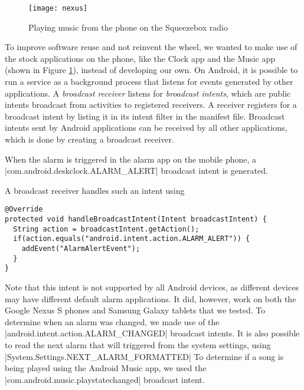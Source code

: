 \begin{figure}
\centering
\texttt{[image: nexus]}
\caption{Playing music from the phone on the Squeezebox radio}
\label{nexus}
\end{figure}

To improve software reuse and not reinvent the wheel, we want\-ed to make use of the stock applications on the phone, like the Clock app and the Music app (shown in Figure \ref{nexus}), instead of developing our own. On Android, it is possible to run a service as a background process that listens for events generated by other applications. A \emph{broadcast receiver} listens for \emph{broadcast intents}, which are public intents broadcast from activities to registered receivers. A receiver registers for a broadcast intent by listing it in its intent filter in the manifest file. Broadcast intents sent by Android applications can be received by all other applications, which is done by creating a broadcast receiver. 

When the alarm is triggered in the alarm app on the mobile phone, a |com.android.deskclock.ALARM_ALERT| broadcast intent is generated. 

A broadcast receiver handles such an intent using 

\begin{verbatim}
@Override
protected void handleBroadcastIntent(Intent broadcastIntent) {
  String action = broadcastIntent.getAction();
  if(action.equals("android.intent.action.ALARM_ALERT")) {
  	addEvent("AlarmAlertEvent");
  }
}
\end{verbatim}

Note that this intent is not supported by all Android devices, as different devices may have different default alarm applications. It did, however, work on both the Google Nexus S phones and Samsung Galaxy tablets that we tested. To determine when an alarm was changed, we made use of the |android.intent.action.ALARM_CHANGED| broadcast intents. It is also possible to read the next alarm that will triggered from the system settings, using |System.Settings.NEXT_ALARM_FORMATTED| To determine if a song is being played using the Android Music app, we used the |com.android.music.playstatechanged| broadcast intent.


